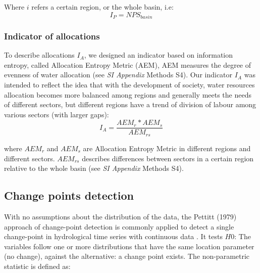 	Where $i$ refers a certain region, or the whole basin, i.e:
	\begin{equation}
		I_P = NPS_{basin}
	\end{equation}

	\subsubsection*{Indicator of allocations}
	To describe allocations $I_A$, we designed an indicator based on information entropy, called Allocation Entropy Metric (AEM), AEM measures the degree of evenness of water allocation (see \textit{SI Appendix} Methods S4).
	Our indicator $I_A$ was intended to reflect the idea that with the development of society, water resources allocation becomes more balanced among regions and generally meets the needs of different sectors, but different regions have a trend of division of labour among various sectors (with larger gaps):
	\begin{equation}
		I_A = \frac{AEM_{r}*AEM_{s}}{AEM_{rs}}
	\end{equation}

	where $AEM_{r}$ and $AEM_{s}$ are Allocation Entropy Metric in different regions and different sectors. $AEM_{rs}$ describes differences between sectors in a certain region relative to the whole basin (see \textit{SI Appendix} Methods S4).

	\subsection{Change points detection}

		With no assumptions about the distribution of the data, the Pettitt (1979) approach of change-point detection is commonly applied to detect a single change-point in hydrological time series with continuous data
        \cite{pettittNonParametricApproachChangePoint1979}.
		It tests $H0$: The variables follow one or more distributions that have the same location parameter (no change), against the alternative: a change point exists. The non-parametric statistic is defined as:

